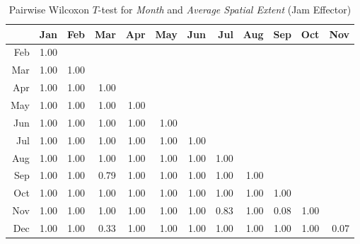     \begin{table}[ht!]
        \tiny
        \centering
        \begin{tabular}{rrrrrrrrrrrr}
            \toprule
                & Jan & Feb & Mar & Apr & May & Jun & Jul & Aug & Sep & Oct & Nov \\ 
            \midrule
            Feb & 1.00 &  &  &  &  &  &  &  &  &  &  \\ 
            Mar & 1.00 & 1.00 &  &  &  &  &  &  &  &  &  \\ 
            Apr & 1.00 & 1.00 & 1.00 &  &  &  &  &  &  &  &  \\ 
            May & 1.00 & 1.00 & 1.00 & 1.00 &  &  &  &  &  &  &  \\ 
            Jun & 1.00 & 1.00 & 1.00 & 1.00 & 1.00 &  &  &  &  &  &  \\ 
            Jul & 1.00 & 1.00 & 1.00 & 1.00 & 1.00 & 1.00 &  &  &  &  &  \\ 
            Aug & 1.00 & 1.00 & 1.00 & 1.00 & 1.00 & 1.00 & 1.00 &  &  &  &  \\ 
            Sep & 1.00 & 1.00 & 0.79 & 1.00 & 1.00 & 1.00 & 1.00 & 1.00 &  &  &  \\ 
            Oct & 1.00 & 1.00 & 1.00 & 1.00 & 1.00 & 1.00 & 1.00 & 1.00 & 1.00 &  &  \\ 
            Nov & 1.00 & 1.00 & 1.00 & 1.00 & 1.00 & 1.00 & 0.83 & 1.00 & 0.08 & 1.00 &  \\ 
            Dec & 1.00 & 1.00 & 0.33 & 1.00 & 1.00 & 1.00 & 1.00 & 1.00 & 1.00 & 1.00 & 0.07 \\ 
            \bottomrule
        \end{tabular}
        \caption{Pairwise Wilcoxon $T$-test for \textit{Month} and \textit{Average Spatial Extent} (Jam Effector)}
        \label{tbl:wilcoxon_baysis_effector_Month_SAvg}
    \end{table}
    

